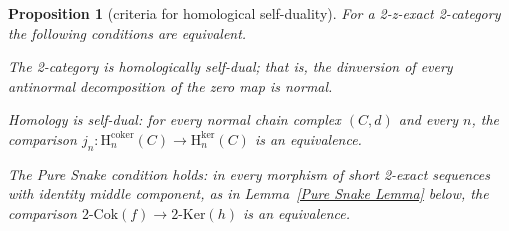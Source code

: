 \documentclass[reqno,a4paper]{amsart}
\numberwithin{equation}{section}
\theoremstyle{plain}
\newtheorem{proposition}[subsection]{Proposition}
\theoremstyle{definition}
\def\nameit#1{\textrm{#1}~}
\def\lemx{\nameit{Lemma}}
\renewcommand{\1}{\onecat{1}}
\newcommand{\coker}{\ensuremath{\mathrm{coker}}}
\newcommand{\TwoKer}{\ensuremath{2\text{-}\mathrm{Ker}}}
\newcommand{\TwoCoker}{\ensuremath{2\text{-}\mathrm{Cok}}}
\newcommand{\Hker}[2]{\ensuremath{\mathrm{H}^{\ker}_{#1}(#2)}}
\newcommand{\Hcoker}[2]{\ensuremath{\mathrm{H}^{\coker}_{#1}(#2)}}
\begin{document}
\begin{proposition}[criteria for homological self-duality]\label{Criteria HSD}
	For a 2-z-exact 2-category the following conditions are equivalent.
	\begin{tfae}
		\item The 2-category is homologically self-dual; that is, the dinversion of every antinormal decomposition of the zero map is normal.
		\item \emph{Homology is self-dual:} for every normal chain complex \((C,d)\) and every \(n\), the comparison \(j_n\colon\Hcoker{n}{C}\to\Hker{n}{C}\) is an equivalence.
		\item \emph{The Pure Snake condition holds:} in every morphism of short 2-exact sequences with identity middle component, as in \lemx\ref{Pure Snake Lemma} below, the comparison \(\TwoCoker(f)\to\TwoKer(h)\) is an equivalence.
	\end{tfae}
\end{proposition}
\end{document}
